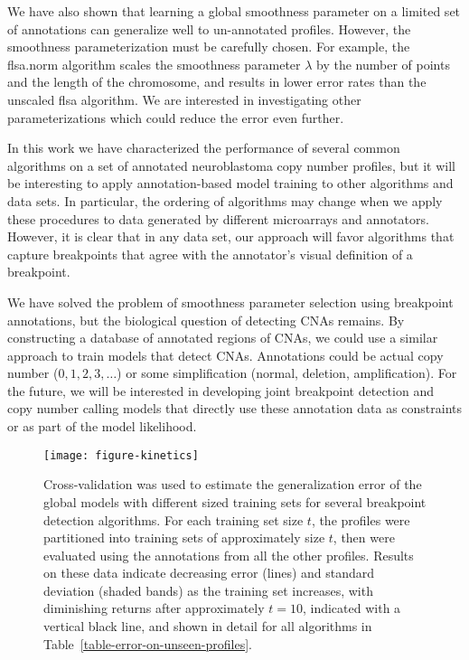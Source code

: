 \documentclass{bioinfo}
\begin{document}
We have also shown that learning a global smoothness parameter on a
limited set of annotations can generalize well to un-annotated
profiles. However, the smoothness parameterization must be carefully
chosen. For example, the flsa.norm algorithm scales the smoothness
parameter $\lambda$ by the number of points and the length of the
chromosome, and results in lower error rates than the unscaled flsa
algorithm. We are interested in investigating other parameterizations
which could reduce the error even further.

In this work we have characterized the performance of several common
algorithms on a set of annotated neuroblastoma copy number profiles,
but it will be interesting to apply annotation-based model training to
other algorithms and data sets. In particular, the ordering of
algorithms may change when we apply these procedures to data generated
by different microarrays and annotators.
However, it is clear that in any data set, our approach will favor
algorithms that capture breakpoints that agree with the annotator's
visual definition of a breakpoint.






We have solved the problem of smoothness parameter selection using
breakpoint annotations, but the biological question of detecting CNAs
remains. By constructing a database of annotated regions of CNAs, we
could use a similar approach to train models that detect
CNAs. Annotations could be actual copy number ($0,1,2,3,\dots$) or
some simplification (normal, deletion, amplification). For the future,
we will be interested in developing joint breakpoint detection and
copy number calling models that directly use these annotation data as
constraints or as part of the model likelihood.

\begin{figure}[b]
  \centering
  \texttt{[image: figure-kinetics]}
  \caption{\label{figure-kinetics} Cross-validation was used to
    estimate the generalization error of the global models with
    different sized training sets for several breakpoint detection
    algorithms. For each training set size $t$, the profiles were
    partitioned into training sets of approximately size $t$, then
    were evaluated using the annotations from all the other
    profiles. Results on these data indicate decreasing error (lines)
    and standard deviation (shaded bands) as the training set
    increases, with diminishing returns after approximately $t=10$,
    indicated with a vertical black line, and shown in detail for all
    algorithms in Table~\ref{table-error-on-unseen-profiles}. }
\end{figure}
\end{document}
